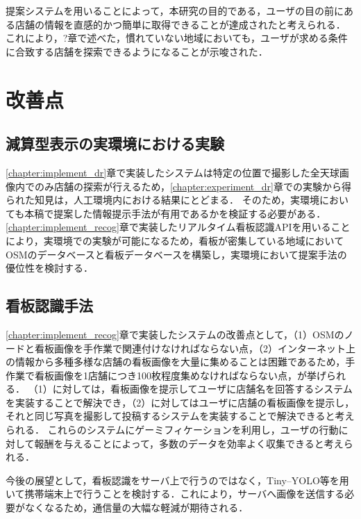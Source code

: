   提案システムを用いることによって，本研究の目的である，ユーザの目の前にある店舗の情報を直感的かつ簡単に取得できることが達成されたと考えられる．
  これにより，?章で述べた，慣れていない地域においても，ユーザが求める条件に合致する店舗を探索できるようになることが示唆された．

\section{改善点}
  \subsection{減算型表示の実環境における実験}
    \ref{chapter:implement_dr}章で実装したシステムは特定の位置で撮影した全天球画像内でのみ店舗の探索が行えるため，\ref{chapter:experiment_dr}章での実験から得られた知見は，人工環境内における結果にとどまる．
    そのため，実環境においても本稿で提案した情報提示手法が有用であるかを検証する必要がある．
    \ref{chapter:implement_recog}章で実装したリアルタイム看板認識APIを用いることにより，実環境での実験が可能になるため，看板が密集している地域においてOSMのデータベースと看板データベースを構築し，実環境において提案手法の優位性を検討する．

  \subsection{看板認識手法}
    \ref{chapter:implement_recog}章で実装したシステムの改善点として，（1）OSMのノードと看板画像を手作業で関連付けなければならない点，（2）インターネット上の情報から多種多様な店舗の看板画像を大量に集めることは困難であるため，手作業で看板画像を1店舗につき100枚程度集めなければならない点，が挙げられる．
    （1）に対しては，看板画像を提示してユーザに店舗名を回答するシステムを実装することで解決でき，（2）に対してはユーザに店舗の看板画像を提示し，それと同じ写真を撮影して投稿するシステムを実装することで解決できると考えられる．
    これらのシステムにゲーミフィケーションを利用し，ユーザの行動に対して報酬を与えることによって，多数のデータを効率よく収集できると考えられる．
    
    今後の展望として，看板認識をサーバ上で行うのではなく，Tiny--YOLO等を用いて携帯端末上で行うことを検討する．これにより，サーバへ画像を送信する必要がなくなるため，通信量の大幅な軽減が期待される．

